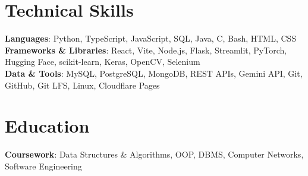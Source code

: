 \documentclass[a4paper]{article}
\begin{document}
\section{Technical Skills}
\begin{resumeBlock}
\textbf{Languages}{: Python, TypeScript, JavaScript, SQL, Java, C, Bash, HTML, CSS} \\
\textbf{Frameworks \& Libraries}{: React, Vite, Node.js, Flask, Streamlit, PyTorch, Hugging Face, scikit-learn, Keras, OpenCV, Selenium} \\
\textbf{Data \& Tools}{: MySQL, PostgreSQL, MongoDB, REST APIs, Gemini API, Git, GitHub, Git LFS, Linux, Cloudflare Pages}
\end{resumeBlock}
\vspace{-6pt}

\section{Education}
  \resumeSubHeadingListStart
    \eduGNIT
  \resumeSubHeadingListEnd
\vspace{-8pt}
\begin{resumeBlock}
\textbf{Coursework}{: Data Structures \& Algorithms, OOP, DBMS, Computer Networks, Software Engineering}
\end{resumeBlock}
\end{document}
